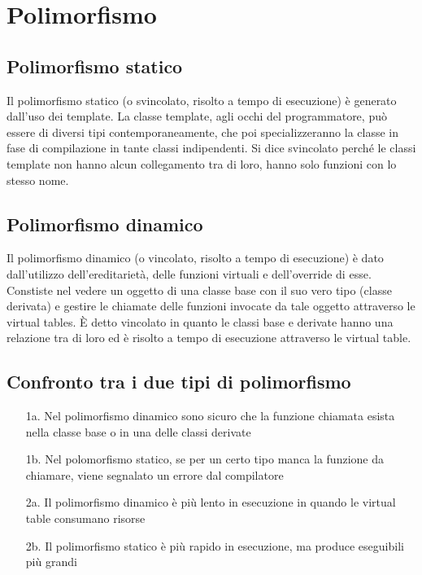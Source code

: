 \documentclass[a4paper]{article}
\begin{document}
\newpage

\section{Polimorfismo}
\subsection{Polimorfismo statico}
Il polimorfismo statico (o svincolato, risolto a tempo di esecuzione) è generato dall'uso dei template. La classe template, agli
occhi del programmatore, può essere di diversi tipi contemporaneamente, che poi specializzeranno la classe in fase di compilazione
in tante classi indipendenti. Si dice svincolato perché le classi template non hanno alcun collegamento tra di loro, hanno solo
funzioni con lo stesso nome.

\subsection{Polimorfismo dinamico}
Il polimorfismo dinamico (o vincolato, risolto a tempo di esecuzione) è dato dall'utilizzo dell'ereditarietà, delle funzioni
virtuali e dell'override di esse. Constiste nel vedere un oggetto di una classe base con il suo vero tipo (classe derivata)
e gestire le chiamate delle funzioni invocate da tale oggetto attraverso le virtual tables. È detto vincolato in quanto le
classi base e derivate hanno una relazione  tra di loro ed è risolto a tempo di esecuzione attraverso le virtual table.

\subsection*{Confronto tra i due tipi di polimorfismo}
\begin{itemize}
	\item[1a.] Nel polimorfismo dinamico sono sicuro che la funzione chiamata esista nella classe base o in una delle classi derivate
	\item[1b.] Nel polomorfismo statico, se per un certo tipo manca la funzione da chiamare, viene segnalato un errore dal compilatore
	\item[2a.] Il polimorfismo dinamico è più lento in esecuzione in quando le virtual table consumano risorse
	\item[2b.] Il polimorfismo statico è più rapido in esecuzione, ma produce eseguibili più grandi  
\end{itemize}
\end{document}
